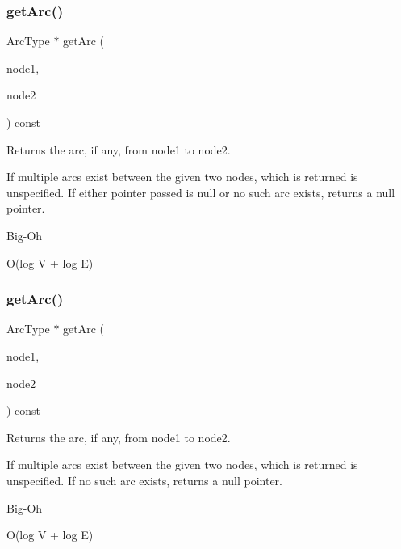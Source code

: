 \subsubsection{\texorpdfstring{get\+Arc()}{getArc()}\hspace{0.1cm}{\footnotesize\ttfamily [1/2]}}
{\footnotesize\ttfamily Arc\+Type $\ast$ get\+Arc (\begin{DoxyParamCaption}\item[{Node\+Type $\ast$}]{node1,  }\item[{Node\+Type $\ast$}]{node2 }\end{DoxyParamCaption}) const}



Returns the arc, if any, from node1 to node2. 

If multiple arcs exist between the given two nodes, which is returned is unspecified. If either pointer passed is null or no such arc exists, returns a null pointer. \begin{DoxyRefDesc}{Big-\/\+Oh}
\item[\mbox{\hyperlink{BigOh__BigOh000060}{Big-\/\+Oh}}]O(log V + log E) \end{DoxyRefDesc}
\mbox{\label{classGraph_a94d4badfc856b0d4530c37121efb9834}} 
\subsubsection{\texorpdfstring{get\+Arc()}{getArc()}\hspace{0.1cm}{\footnotesize\ttfamily [2/2]}}
{\footnotesize\ttfamily Arc\+Type $\ast$ get\+Arc (\begin{DoxyParamCaption}\item[{const std\+::string \&}]{node1,  }\item[{const std\+::string \&}]{node2 }\end{DoxyParamCaption}) const}



Returns the arc, if any, from node1 to node2. 

If multiple arcs exist between the given two nodes, which is returned is unspecified. If no such arc exists, returns a null pointer. \begin{DoxyRefDesc}{Big-\/\+Oh}
\item[\mbox{\hyperlink{BigOh__BigOh000061}{Big-\/\+Oh}}]O(log V + log E) \end{DoxyRefDesc}
\mbox{\label{classGraph_a0690edaeae8d5256189ae2e8541788b5}} 
